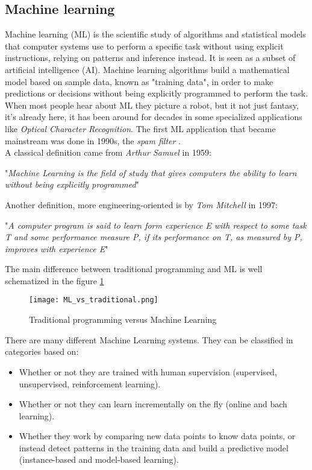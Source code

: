 \subsection{Machine learning}\label{ML}
Machine learning (ML) is the scientific study of algorithms and statistical models that computer systems use to perform a specific task without using explicit instructions, relying on patterns and inference instead. It is seen as a subset of artificial intelligence (AI). Machine learning algorithms build a mathematical model based on sample data, known as "training data", in order to make predictions or decisions without being explicitly programmed to perform the task.
\\ \indent
When most people hear about ML they picture a robot, but it not just fantasy, it's already here, it has been around for decades in some specialized applications like \textit{Optical Character Recognition}. The first ML application that became mainstream was done in 1990s, the \textit{spam filter} \cite{geron2019hands}.
\\
A classical definition came from \textit{Arthur Samuel} in 1959:
\begin{center}
"\textit{Machine Learning is the field of study that gives computers the ability to learn without being explicitly programmed}" 
\end{center}
Another definition, more engineering-oriented is by \textit{Tom Mitchell} in 1997:
\begin{center}
"\textit{A computer program is said to learn form experience E with respect to some task T and some performance measure P, if its performance on T, as measured by P, improves with experience E}"
\end{center}
The main difference between traditional programming and ML is well schematized in the figure \ref{fig:ML_vs_traditional}
\begin{figure}[h]
    \centering
    \texttt{[image: ML\_vs\_traditional.png]} 
	\caption{Traditional programming versus Machine Learning}
    \label{fig:ML_vs_traditional}
\end{figure}
There are many different Machine Learning systems. They can be classified in categories based on:
\begin{itemize}
	\item Whether or not they are trained with human supervision (supervised, unsupervised, reinforcement learning).
	\item Whether or not they can learn incrementally on the fly (online and bach learning).
	\item Whether they work by comparing new data points to know data points, or instead detect patterns in the training data and build a predictive model (instance-based and model-based learning).
\end{itemize}
